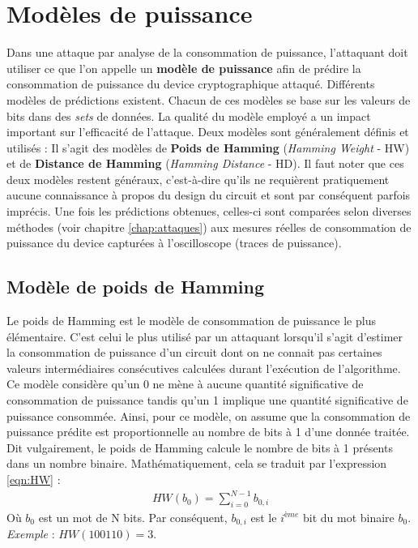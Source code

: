 \documentclass[oneside]{book}
\begin{document}
\section{Modèles de puissance}
\label{sec:modelpuissance}
Dans une attaque par analyse de la consommation de puissance, l'attaquant doit utiliser ce que l'on appelle un \textbf{modèle de puissance} afin de prédire la consommation de puissance du device cryptographique attaqué. Différents modèles de prédictions existent. Chacun de ces modèles se base sur les valeurs de bits dans des \textit{sets} de données. La qualité du modèle employé a un impact important sur l'efficacité de l'attaque. Deux modèles sont généralement définis et utilisés : Il s'agit des modèles de \textbf{Poids de Hamming} (\textit{Hamming Weight} - HW) et de \textbf{Distance de Hamming} (\textit{Hamming Distance} - HD). Il faut noter que ces deux modèles restent généraux, c'est-à-dire qu'ils ne requièrent pratiquement aucune connaissance à propos du design du circuit et sont par conséquent parfois imprécis. Une fois les prédictions obtenues, celles-ci sont comparées selon diverses méthodes (voir chapitre \ref{chap:attaques}) aux mesures réelles de consommation de puissance du device capturées à l'oscilloscope (traces de puissance). 

\subsection{Modèle de poids de Hamming}
\label{sec:modelHW}

Le poids de Hamming est le modèle de consommation de puissance le plus élémentaire. C'est celui le plus utilisé par un attaquant lorsqu'il s'agit d'estimer la consommation de puissance d'un circuit dont on ne connait pas certaines valeurs intermédiaires consécutives calculées durant l'exécution de l'algorithme. Ce modèle considère qu'un 0 ne mène à aucune quantité significative de consommation de puissance tandis qu'un 1 implique une quantité significative de puissance consommée. Ainsi, pour ce modèle, on assume que la consommation de puissance prédite est proportionnelle au nombre de bits à 1 d'une donnée traitée. Dit vulgairement, le poids de Hamming calcule le nombre de bits à 1 présents dans un nombre binaire. Mathématiquement, cela se traduit par l'expression \ref{eqn:HW} : \\
\begin{gather}
	HW(b_{0}) = \sum_{i=0}^{N-1} b_{0,i}\label{eqn:HW}
\end{gather}
Où $b_{0}$ est un mot de N bits. Par conséquent, $b_{0,i}$ est le $i^{ème}$ bit du mot binaire $b_{0}$. \\
\textit{Exemple} : $HW(100110) = 3.$
\end{document}
